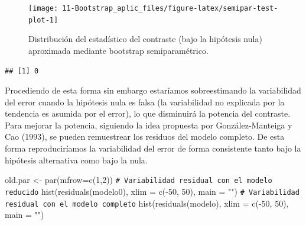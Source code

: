 \documentclass[
]{book}
\newenvironment{Shaded}{\begin{snugshade}}{\end{snugshade}}
\newcommand{\AttributeTok}[1]{\textcolor[rgb]{0.77,0.63,0.00}{#1}}
\newcommand{\CommentTok}[1]{\textcolor[rgb]{0.56,0.35,0.01}{\textit{#1}}}
\newcommand{\DecValTok}[1]{\textcolor[rgb]{0.00,0.00,0.81}{#1}}
\newcommand{\FunctionTok}[1]{\textcolor[rgb]{0.00,0.00,0.00}{#1}}
\newcommand{\NormalTok}[1]{#1}
\newcommand{\OtherTok}[1]{\textcolor[rgb]{0.56,0.35,0.01}{#1}}
\newcommand{\SpecialCharTok}[1]{\textcolor[rgb]{0.00,0.00,0.00}{#1}}
\newcommand{\StringTok}[1]{\textcolor[rgb]{0.31,0.60,0.02}{#1}}
\theoremstyle{break}
\theoremstyle{nonumberplain}
\renewcommand{\CommentTok}[1]{\textcolor[rgb]{0.41,0.41,0.41}{\texttt{#1}}}
\begin{document}
\begin{figure}[!htb]

{\centering \texttt{[image: 11-Bootstrap\_aplic\_files/figure-latex/semipar-test-plot-1]} 

}

\caption{Distribución del estadístico del contraste (bajo la hipótesis nula) aproximada mediante bootstrap semiparamétrico.}\label{fig:semipar-test-plot}
\end{figure}

\begin{Shaded}
\end{Shaded}

\begin{verbatim}
## [1] 0
\end{verbatim}

Procediendo de esta forma sin embargo estaríamos sobreestimando la variabilidad
del error cuando la hipótesis nula es falsa (la variabilidad no explicada por la
tendencia es asumida por el error), lo que disminuirá la potencia del contraste.
Para mejorar la potencia, siguiendo la idea propuesta por González-Manteiga
y Cao (1993), se pueden remuestrear los residuos del modelo completo.
De esta forma reproduciríamos la variabilidad del error de forma consistente
tanto bajo la hipótesis alternativa como bajo la nula.

\begin{Shaded}
\begin{Highlighting}[]
\NormalTok{old.par }\OtherTok{\textless{}{-}} \FunctionTok{par}\NormalTok{(}\AttributeTok{mfrow=}\FunctionTok{c}\NormalTok{(}\DecValTok{1}\NormalTok{,}\DecValTok{2}\NormalTok{))}
\CommentTok{\# Variabilidad residual con el modelo reducido}
\FunctionTok{hist}\NormalTok{(}\FunctionTok{residuals}\NormalTok{(modelo0), }\AttributeTok{xlim =} \FunctionTok{c}\NormalTok{(}\SpecialCharTok{{-}}\DecValTok{50}\NormalTok{, }\DecValTok{50}\NormalTok{), }\AttributeTok{main =} \StringTok{""}\NormalTok{)}
\CommentTok{\# Variabilidad residual con el modelo completo}
\FunctionTok{hist}\NormalTok{(}\FunctionTok{residuals}\NormalTok{(modelo), }\AttributeTok{xlim =} \FunctionTok{c}\NormalTok{(}\SpecialCharTok{{-}}\DecValTok{50}\NormalTok{, }\DecValTok{50}\NormalTok{), }\AttributeTok{main =} \StringTok{""}\NormalTok{)}
\end{Highlighting}
\end{Shaded}
\end{document}
